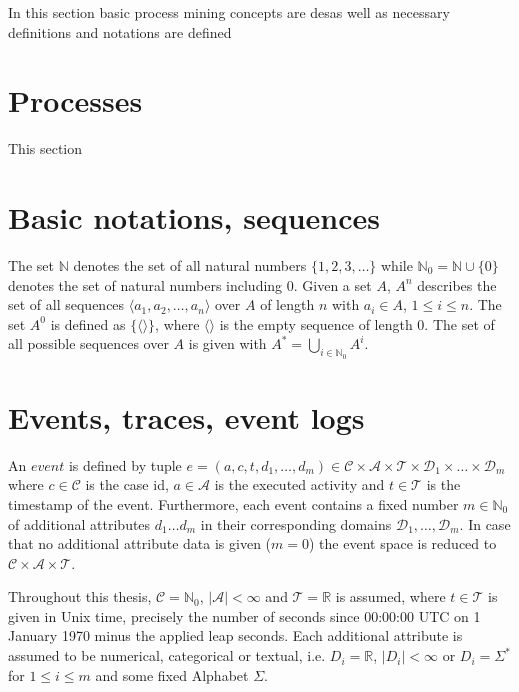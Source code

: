 In this section basic process mining concepts are desas well as necessary definitions and notations are defined


\section{Processes}

This section 

\section{Basic notations, sequences}

The set $\mathbb{N}$ denotes the set of all natural numbers $\{1, 2, 3, \dots\}$ while $\mathbb{N}_0 = \mathbb{N} \cup \{0\}$ denotes the set of natural numbers including 0.
Given a set $A$, $A^n$ describes the set of all sequences $\langle a_1, a_2, \dots, a_n\rangle$ over $A$ of length $n$ with $a_i \in A$, $1 \leq i \leq n$.
The set $A^0$ is defined as $\{\langle \rangle\}$, where $\langle \rangle$ is the empty sequence of length $0$.
The set of all possible sequences over $A$ is given with $A^* = \bigcup\limits_{i\in \mathbb{N}_0} A^i$.



\section{Events, traces, event logs}


\begin{definition}
An  $event$ is defined by tuple $e = (a,c,t,d_1,\dots, d_m) \in \mathcal{C} \times \mathcal{A}  \times \mathcal{T} \times \mathcal{D}_1 \times \dots \times \mathcal{D}_m$ where  $c \in \mathcal{C} $ is the case id, $a \in \mathcal{A}$ is the executed activity and $t \in \mathcal{T}$ is the timestamp of the event.
Furthermore, each event contains a fixed number $m \in \mathbb{N}_0$ of additional attributes $d_1 \dots d_m$ in their corresponding domains $\mathcal{D}_1, \dots , \mathcal{D}_m$.
In case that no additional attribute data is given ($m = 0$) the event space is reduced to $\mathcal{C} \times \mathcal{A}  \times \mathcal{T}$.
\end{definition}

Throughout this thesis,  $\mathcal{C} = \mathbb{N}_0$, $|\mathcal{A}| < \infty$ and $ \mathcal{T} = \mathbb{R}$ is assumed, where $t \in \mathcal{T}$ is given in Unix time, precisely the number of seconds since 00:00:00 UTC on 1 January 1970 minus the applied leap seconds.
Each additional attribute is assumed to be numerical, categorical or textual, i.e. $D_i = \mathbb{R}$, $|D_i| < \infty$ or $D_i = \Sigma^\ast$  for $1 \leq i \leq m$ and some fixed Alphabet $\Sigma$.



